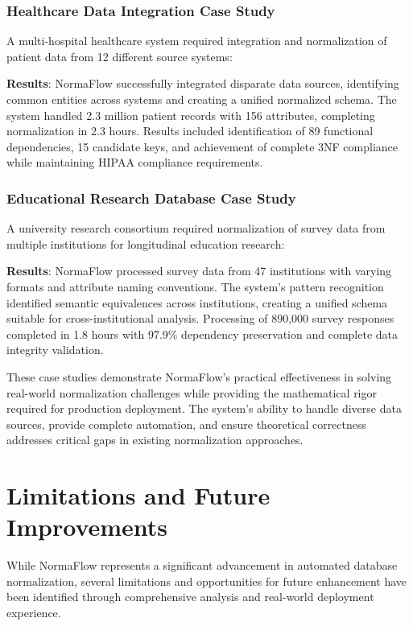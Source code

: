 \documentclass[acmsmall]{acmart}
\begin{document}
\subsubsection{Healthcare Data Integration Case Study}

A multi-hospital healthcare system required integration and normalization of patient data from 12 different source systems:

\textbf{Results}: NormaFlow successfully integrated disparate data sources, identifying common entities across systems and creating a unified normalized schema. The system handled 2.3 million patient records with 156 attributes, completing normalization in 2.3 hours. Results included identification of 89 functional dependencies, 15 candidate keys, and achievement of complete 3NF compliance while maintaining HIPAA compliance requirements.

\subsubsection{Educational Research Database Case Study}

A university research consortium required normalization of survey data from multiple institutions for longitudinal education research:

\textbf{Results}: NormaFlow processed survey data from 47 institutions with varying formats and attribute naming conventions. The system's pattern recognition identified semantic equivalences across institutions, creating a unified schema suitable for cross-institutional analysis. Processing of 890,000 survey responses completed in 1.8 hours with 97.9\% dependency preservation and complete data integrity validation.

These case studies demonstrate NormaFlow's practical effectiveness in solving real-world normalization challenges while providing the mathematical rigor required for production deployment. The system's ability to handle diverse data sources, provide complete automation, and ensure theoretical correctness addresses critical gaps in existing normalization approaches.

\section{Limitations and Future Improvements}

While NormaFlow represents a significant advancement in automated database normalization, several limitations and opportunities for future enhancement have been identified through comprehensive analysis and real-world deployment experience.
\end{document}
